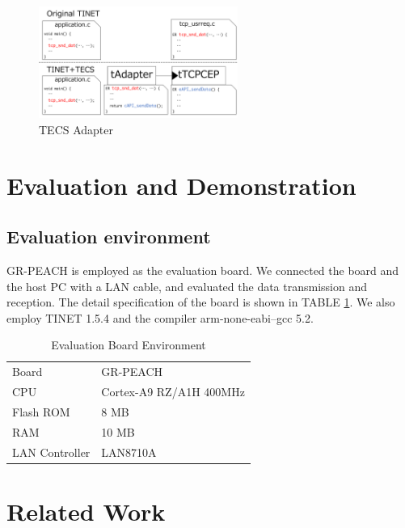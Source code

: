 \documentclass[conference]{IEEEtran/IEEEtran}
\begin{document}
\begin{figure}[t]
    \centering
    \includegraphics[width=6.5cm,clip]{figure/TECS_Adapter.pdf}
    \caption{TECS Adapter}
    \label{fig:TECS_Adapter}
\end{figure}




\section{Evaluation and Demonstration}
\label{sec:Evaluation and Demonstration}

\subsection{Evaluation environment}

GR-PEACH is employed as the evaluation board.
We connected the board and the host PC with a LAN cable, and evaluated the data transmission and reception.
The detail specification of the board is shown in TABLE \ref{tab:EvaluationBoardEnvironment}.
We also employ TINET 1.5.4 and the compiler arm-none-eabi--gcc 5.2.

\begin{table}[t]
    \centering
    \caption{Evaluation Board Environment}
    \begin{tabular}{l|l}
        \hline\hline
        Board           &   GR-PEACH                \\
        CPU             &   Cortex-A9 RZ/A1H 400MHz \\
        Flash ROM       &   8 MB                    \\
        RAM             &   10 MB                   \\
        LAN Controller  &   LAN8710A                \\
        \hline
    \end{tabular}
    \label{tab:EvaluationBoardEnvironment}
\end{table}


\section{Related Work}
\label{sec:Related Work}
\end{document}
